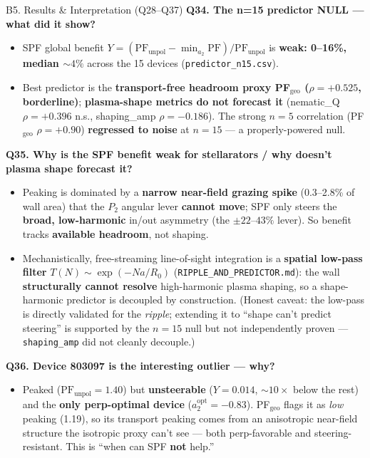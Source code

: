 \documentclass[11pt,aspectratio=169]{beamer}
\newcommand{\qitem}[1]{\medskip\textbf{#1}\par}
\begin{document}
\begin{frame}[allowframebreaks]{B5. Results \& Interpretation (Q28--Q37)}
\qitem{Q34. The n=15 predictor NULL --- what did it show?}
\begin{itemize}
\item SPF global benefit
      $Y = (\mathrm{PF}_{\text{unpol}} - \min_{a_2}\mathrm{PF})/\mathrm{PF}_{\text{unpol}}$ is
      \textbf{weak: 0--16\%, median $\sim 4\%$} across the 15 devices
      (\texttt{predictor\_n15.csv}).
\item Best predictor is the \textbf{transport-free headroom proxy PF$_{\mathrm{geo}}$
      ($\rho = +0.525$, borderline)}; \textbf{plasma-shape metrics do not forecast it}
      (nematic\_Q $\rho = +0.396$ n.s., shaping\_amp $\rho = -0.186$). The strong $n=5$
      correlation (PF$_{\mathrm{geo}}$ $\rho = +0.90$) \textbf{regressed to noise} at $n=15$ ---
      a properly-powered null.
\end{itemize}

\qitem{Q35. Why is the SPF benefit weak for stellarators / why doesn't plasma shape forecast it?}
\begin{itemize}
\item Peaking is dominated by a \textbf{narrow near-field grazing spike} (0.3--2.8\% of wall
      area) that the $P_2$ angular lever \textbf{cannot move}; SPF only steers the \textbf{broad,
      low-harmonic} in/out asymmetry (the $\pm 22$--$43\%$ lever). So benefit tracks
      \textbf{available headroom}, not shaping.
\item Mechanistically, free-streaming line-of-sight integration is a \textbf{spatial low-pass
      filter} $T(N) \sim \exp(-N a/R_0)$ (\texttt{RIPPLE\_AND\_PREDICTOR.md}): the wall
      \textbf{structurally cannot resolve} high-harmonic plasma shaping, so a shape-harmonic
      predictor is decoupled by construction. (Honest caveat: the low-pass is directly
      validated for the \emph{ripple}; extending it to ``shape can't predict steering'' is
      supported by the $n=15$ null but not independently proven --- \texttt{shaping\_amp} did
      not cleanly decouple.)
\end{itemize}

\framebreak
\qitem{Q36. Device 803097 is the interesting outlier --- why?}
\begin{itemize}
\item Peaked ($\mathrm{PF}_{\text{unpol}} = 1.40$) but \textbf{unsteerable} ($Y = 0.014$,
      $\sim 10\times$ below the rest) and the \textbf{only perp-optimal device}
      ($a_2^{\text{opt}} = -0.83$). PF$_{\mathrm{geo}}$ flags it as \emph{low} peaking (1.19),
      so its transport peaking comes from an anisotropic near-field structure the isotropic
      proxy can't see --- both perp-favorable and steering-resistant. This is ``when can SPF
      \textbf{not} help.''
\end{itemize}


\end{frame}
\end{document}

